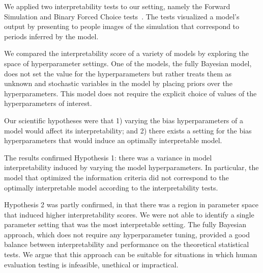 \documentclass[letterpaper]{article} %
\newcommand{\citename}[1]{\citeauthor{#1}~\shortcite{#1}}
\newcommand{\kibitz}[2]{\ifnum\Comments=1{\textcolor{#1}{#2}}\fi}
\newcommand{\kg}[1]{\kibitz{red}{[KG:#1]}}
\begin{document}


We applied two interpretability tests to our setting, namely the Forward Simulation and Binary Forced Choice tests~\cite{doshi2017roadmap}.
The tests visualized a model's output by presenting to people images of the simulation that correspond to periods inferred by the model.

We compared the interpretability score %
of a variety of models by exploring the space of hyperparameter settings.
One of the models, the fully Bayesian model, does not set the value for the hyperparameters but rather treats them as unknown and stochastic variables in the model by placing priors over the hyperparameters.
This model does not require the explicit choice of values of the hyperparameters of interest.

Our scientific hypotheses were that 1) varying the bias hyperparameters of a model would affect its interpretability; and 2) there exists a setting for the bias hyperparameters that would induce an optimally interpretable model.


The results confirmed Hypothesis 1: there was a variance in model interpretability induced by varying the model hyperparameters.
In particular, the model that optimized the information criteria did not correspond to the optimally interpretable model according to the interpretability tests.

Hypothesis 2 was partly confirmed, in that there was a region in parameter space that induced higher interpretability scores. We were not able to identify a single parameter setting that was the most interpretable setting.
The fully Bayesian approach, which does not require any hyperparameter tuning, provided a good balance between interpretability and performance on the theoretical statistical tests.
We argue that this approach can be suitable for situations in which human evaluation testing is infeasible, unethical or impractical.
\end{document}
